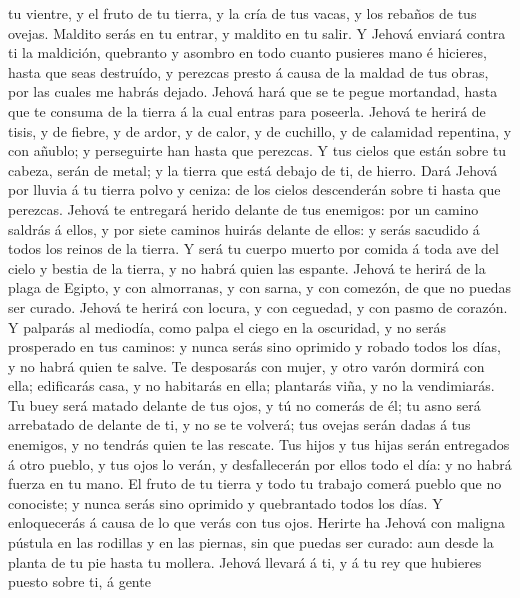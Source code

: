 tu vientre, y el fruto de tu tierra, y la cría de tus vacas, y los
rebaños de tus ovejas.  Maldito serás en tu entrar, y
maldito en tu salir.  Y Jehová enviará contra ti la
maldición, quebranto y asombro en todo cuanto pusieres mano é hicieres,
hasta que seas destruído, y perezcas presto á causa de la maldad de tus
obras, por las cuales me habrás dejado.  Jehová hará que se
te pegue mortandad, hasta que te consuma de la tierra á la cual entras
para poseerla.  Jehová te herirá de tisis, y de fiebre, y
de ardor, y de calor, y de cuchillo, y de calamidad repentina, y con
añublo; y perseguirte han hasta que perezcas.  Y tus cielos
que están sobre tu cabeza, serán de metal; y la tierra que está debajo
de ti, de hierro.  Dará Jehová por lluvia á tu tierra polvo
y ceniza: de los cielos descenderán sobre ti hasta que perezcas.
 Jehová te entregará herido delante de tus enemigos: por un
camino saldrás á ellos, y por siete caminos huirás delante de ellos: y
serás sacudido á todos los reinos de la tierra.  Y será tu
cuerpo muerto por comida á toda ave del cielo y bestia de la tierra, y
no habrá quien las espante.  Jehová te herirá de la plaga
de Egipto, y con almorranas, y con sarna, y con comezón, de que no
puedas ser curado.  Jehová te herirá con locura, y con
ceguedad, y con pasmo de corazón.  Y palparás al mediodía,
como palpa el ciego en la oscuridad, y no serás prosperado en tus
caminos: y nunca serás sino oprimido y robado todos los días, y no habrá
quien te salve.  Te desposarás con mujer, y otro varón
dormirá con ella; edificarás casa, y no habitarás en ella; plantarás
viña, y no la vendimiarás.  Tu buey será matado delante de
tus ojos, y tú no comerás de él; tu asno será arrebatado de delante de
ti, y no se te volverá; tus ovejas serán dadas á tus enemigos, y no
tendrás quien te las rescate.  Tus hijos y tus hijas serán
entregados á otro pueblo, y tus ojos lo verán, y desfallecerán por ellos
todo el día: y no habrá fuerza en tu mano.  El fruto de tu
tierra y todo tu trabajo comerá pueblo que no conociste; y nunca serás
sino oprimido y quebrantado todos los días.  Y enloquecerás
á causa de lo que verás con tus ojos.  Herirte ha Jehová
con maligna pústula en las rodillas y en las piernas, sin que puedas ser
curado: aun desde la planta de tu pie hasta tu mollera. 
Jehová llevará á ti, y á tu rey que hubieres puesto sobre ti, á gente
